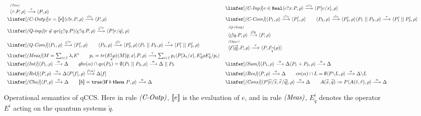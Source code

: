 \documentclass[a4paper,runningheads]{llncs}
\newcommand{\pair}[1]{\langle{#1}\rangle}
\newcommand{\qc}{\underline{c}}
\newcommand{\CE}{{\cal E}}
\newcommand{\ifthen}[2]{{\textbf{if} ~#1~ \textbf{then} ~#2}}
\begin{document}
\begin{figure}[t]
	\[\small\begin{array}{ll}
	\slinfer[\Rlts{Tau}]{\pair{\tau.P, \rho} \ar{\tau} \pair{P, \rho}}
	&\linfer[\Rlts{C-Inp}]{v\in\texttt{Real}}{\pair{c?x.P,\rho} \ar{c?v} \pair{P[v/x],\rho}}
	\\[3pt]
	\linfer[\Rlts{C-Outp}]{v=\Op{e}}{\pair{c!e.P,\rho} \ar{c!v} \pair{P,\rho} }
	
	&
	\linfer[\Rlts{C-Com}]{\pair{P_1,\rho}\ar{c?v}\pair{P'_1,\rho}\qquad
		\pair{P_2,\rho}\ar{c!v}\pair{P'_2,\rho}
	}
	{\pair{P_1\Cpar P_2,\rho} \ar{\tau} \pair{P'_1\Cpar P'_2,\rho} }
	\\[3pt]
	\linfer[\Rlts{Q-inp}]{r\not\in qv(\qc?q.P)}
	{\pair{\qc?q.P,\rho} \ar{\qc?r} \pair{P[r/q],\rho}}
	&
	\slinfer[\Rlts{Q-Outp}]{\pair{\qc!q.P,\rho} \ar{\qc!q} \pair{P,\rho} }
	\\[3pt]
	\linfer[\Rlts{Q-Com}]{\pair{P_1,\rho} \ar{\qc?r} \pair{P'_1,\rho} \qquad \pair{P_2,\rho}\ar{\qc!r} \pair{P'_2,\rho}}
	{\pair{P_1\Cpar P_2, \rho } \ar{\tau} \pair{P'_1\Cpar P'_2, \rho}}
	&
	\slinfer[\Rlts{Oper}]{\pair{\CE[\widetilde{q}].P,\rho} \ar{\tau} \pair{P,\CE_{\widetilde{q}}(\rho)}}
	\\[3pt]
	\linfer[\Rlts{Meas}]{M=\sum_{i\in I}\lambda_i E^i \qquad p_i=tr(E^i_{\widetilde{q}}\rho)}
	{\pair{M[\tilde{q};x].P,\rho} \ar{\tau} \sum_{i\in I}p_i \pair{P[\lambda_i/x], E^i_{\tilde{q}}\rho E^i_{\tilde{q}} / p_i}}
	&
	\\
	\linfer[\Rlts{Int}]{\pair{P_1,\rho} \ar{\alpha} \Delta\qquad qbv(\alpha)\cap qv(P_2)=\emptyset}{\pair{P_1 \Cpar P_2,\rho} \ar{\alpha} \Delta\Cpar P_2}
	&
	\linfer[\Rlts{Sum}]{\pair{P_1,\rho} \ar{\alpha} \Delta}{\pair{P_1+P_2,\rho} \ar{\alpha} \Delta}
	\\[3pt]
	\linfer[\Rlts{Rel}]{\pair{P,\rho} \ar{\alpha} \Delta}{\pair{P[f],\rho} \ar{f(\alpha)} \Delta[f]}
	&
	\linfer[\Rlts{Res}]{\pair{P,\rho} \ar{\alpha} \Delta \qquad cn(\alpha)\cap L=\emptyset}{\pair{P\backslash L,\rho} \ar{\alpha} \Delta\backslash L}
	\\[3pt]
	\linfer[\Rlts{Cho}]{\pair{P,\rho} \ar{\alpha} \Delta \qquad \Op{b}=\texttt{true}}{\pair{\ifthen{b}{P},\rho} \ar{\alpha} \Delta}
	&
	\linfer[\Rlts{Cons}]{\pair{P[\widetilde{v}/\widetilde{x},\widetilde{r}/\widetilde{q}],\rho} \ar{\alpha} \Delta \qquad A(\widetilde{x}, \widetilde{q})\Defs P}{\pair{A(\tilde{v},\tilde{r}),\rho} \ar{\alpha} \Delta}
	\end{array}\]
	\caption{Operational semantics of qCCS. Here in rule $\textit{(C-Outp)}$, $\mbox{[\![}e\mbox{]\!]}$ is the evaluation of $e$, and in rule $\textit{(Meas)}$, $E^i_{\tilde{q}}$ denotes the operator $E^i$ acting on the quantum systems $\tilde{q}$.\label{fig:opsem}
	}
\end{figure}
\end{document}
